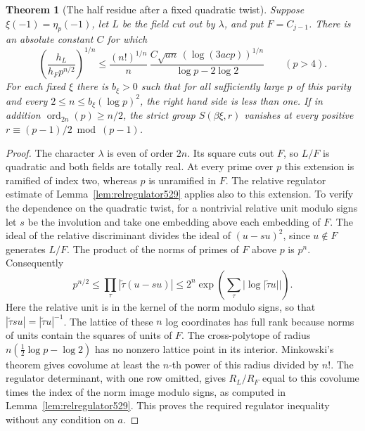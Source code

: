 \documentclass[a4paper,11pt]{article}
\newtheorem{theorem}[proposition]{Theorem}
\theoremstyle{definition}
\theoremstyle{remark}
\numberwithin{equation}{section}
\begin{document}
\begin{theorem}[The half residue after a fixed quadratic twist]
\leavevmode\label{thm:complexhalf542}
Suppose \(\xi(-1)=\eta_p(-1)\), let \(L\) be the field cut out
by \(\lambda\), and put \(F=C_{j-1}\).
There is an absolute constant \(C\) for which
\[
 \left(\frac{h_L}{h_F p^{n/2}}\right)^{1/n}
 \le \frac{(n!)^{1/n}}{n}\,
      \frac{C\sqrt{a n}\,(\log(3acp))^{1/n}}
                         {\log p-2\log2}
             \qquad(p>4).
\]
For each fixed \(\xi\) there is \(b_\xi>0\) such that for all
sufficiently large \(p\) of this parity and every
\(2\le n\le b_\xi(\log p)^2\), the right hand side is less
than one. If in addition
\(\operatorname{ord}_{2n}(p)\ge n/2\), the strict group
\(S(\beta\xi,r)\) vanishes at every positive
\(r\equiv(p-1)/2\bmod(p-1)\).
\end{theorem}
\begin{proof}
The character \(\lambda\) is even of order \(2n\).
Its square cuts out \(F\), so \(L/F\) is quadratic and both
fields are totally real. At every prime over \(p\) this
extension is ramified of index two, whereas \(p\) is
unramified in \(F\). The relative regulator estimate of
Lemma~\ref{lem:relregulator529} applies also to this extension.
To verify the dependence on the quadratic twist, for a
nontrivial relative unit modulo signs let \(s\) be the
involution and take one embedding above each embedding of \(F\).
The ideal of the relative discriminant divides the ideal of
\((u-su)^2\), since \(u\notin F\) generates \(L/F\).
The product of the norms of primes of \(F\) above \(p\) is
\(p^n\). Consequently
\[
        p^{n/2}\le\prod_\tau|\widetilde\tau(u-su)|
              \le 2^n\exp\left(\sum_\tau
                                  |\log|\widetilde\tau u||\right).
\]
Here the relative unit is in the kernel of the norm modulo
signs, so that \(|\widetilde\tau su|=|\widetilde\tau u|^{-1}\).
The lattice of these \(n\) log coordinates has full rank
because norms of units contain the squares of units of \(F\).
The cross-polytope of radius \(n(\tfrac12\log p-\log2)\)
has no nonzero lattice point in its interior. Minkowski's
theorem gives covolume at least the \(n\)-th power of this
radius divided by \(n!\). The regulator determinant, with
one row omitted, gives \(R_L/R_F\) equal to this covolume
times the index of the norm image modulo signs, as computed in
Lemma~\ref{lem:relregulator529}. This proves the required
regulator inequality without any condition on \(a\).


\end{proof}
\end{document}
